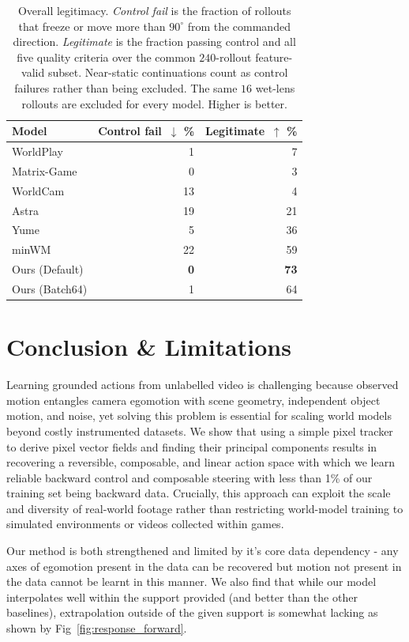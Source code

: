 \documentclass[letterpaper]{article} %
\begin{document}
\begin{table}[t]
\centering
{
\small
\setlength{\tabcolsep}{4pt}
\begin{tabular}{lrr}
\toprule
Model & Control fail\, $\downarrow$ \% & Legitimate\, $\uparrow$ \% \\
\midrule
WorldPlay      & 1  & 7  \\
Matrix-Game    & 0  & 3  \\
WorldCam       & 13 & 4  \\
Astra          & 19 & 21 \\
Yume           & 5  & 36 \\
minWM          & 22 & 59 \\
Ours (Default) & \textbf{0}  & \textbf{73} \\
Ours (Batch64) & 1  & 64 \\
\bottomrule
\end{tabular}
}
\caption{
    Overall legitimacy. \emph{Control fail} is the fraction of rollouts that
    freeze or move more than $90^{\circ}$ from the commanded direction.
    \emph{Legitimate} is the fraction passing control and all five quality
    criteria over the common $240$-rollout feature-valid subset. Near-static
    continuations count as control failures rather than being excluded. The
    same $16$ wet-lens rollouts are excluded for every model. Higher is better.
}
\label{tab:overall_legit}
\end{table}

\section{Conclusion \& Limitations}

Learning grounded actions from unlabelled video is challenging because observed
motion entangles camera egomotion with scene geometry, independent object
motion, and noise, yet solving this problem is essential for scaling world
models beyond costly instrumented datasets. We show that using a simple pixel tracker to derive pixel vector fields and finding their principal components results in recovering a reversible, composable, and linear action space with which we learn reliable backward control and composable steering with less than 1\% of our training set being backward data. Crucially, this approach can exploit the scale and diversity of real-world
footage rather than restricting world-model training to simulated environments
or videos collected within games.

Our method is both strengthened and limited by it's core data dependency - any axes of egomotion present in the data can be recovered but motion not present in the data cannot be learnt in this manner. We also find that while our model interpolates well within the support provided (and better than the other baselines), extrapolation outside of the given support is somewhat lacking as shown by Fig~\ref{fig:response_forward}.
\end{document}
